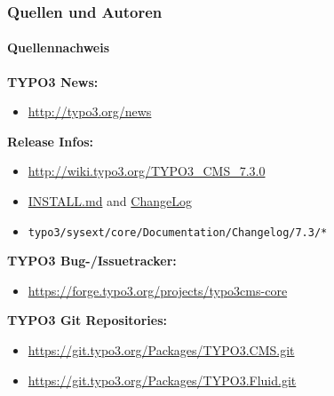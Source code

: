 \begin{frame}[fragile]
	\frametitle{Quellen und Autoren}
	\framesubtitle{Quellennachweis}

	\textbf{TYPO3 News:}
		\begin{itemize}\smaller
			\item \url{http://typo3.org/news}
		\end{itemize}

	\textbf{Release Infos:}
		\begin{itemize}\smaller
			\item \url{http://wiki.typo3.org/TYPO3_CMS_7.3.0}
			\item \href{https://github.com/TYPO3/TYPO3.CMS/blob/master/INSTALL.md}{INSTALL.md} and \href{https://github.com/TYPO3/TYPO3.CMS/blob/master/ChangeLog}{ChangeLog}
			\item \texttt{typo3/sysext/core/Documentation/Changelog/7.3/*}
		\end{itemize}

	\textbf{TYPO3 Bug-/Issuetracker:}
		\begin{itemize}\smaller
			\item \url{https://forge.typo3.org/projects/typo3cms-core}
		\end{itemize}

	\textbf{TYPO3 Git Repositories:}
		\begin{itemize}\smaller
			\item \url{https://git.typo3.org/Packages/TYPO3.CMS.git}
			\item \url{https://git.typo3.org/Packages/TYPO3.Fluid.git}
		\end{itemize}

\end{frame}


